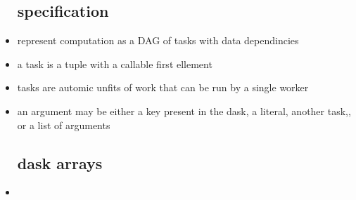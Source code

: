 \documentclass{article}
\begin{document}
\begin{itemize}
\subsection*{specification }
\item represent computation as a DAG of tasks with data dependincies 
\item a task is a tuple with  a callable first ellement 
\item tasks are automic unfits of work that can be run by a single worker
\item an argument may be either a key present in the dask, a literal, another task,, or a list of arguments
\subsection*{dask arrays}
\item 
\end{itemize}
\end{document}
